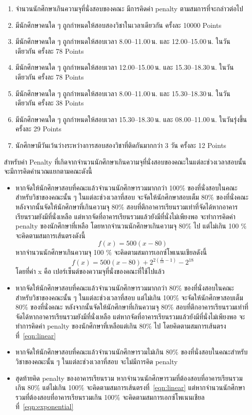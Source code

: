 \begin{enumerate}
    \item จํานวนนักศึกษาเกินความจุที่นั่งสอบของคณะ มีการคิดค่า penalty ตามสมการที่จะกล่าวต่อไป
    \item มีนักศึกษาคนใด ๆ ถูกกำหนดให้สอบสองวิชาในเวลาเดียวกัน ครั้งละ 10000 Points
    \item มีนักศึกษาคนใด ๆ ถูกกำหนดให้สอบเวลา 8.00--11.00\,น. และ 12.00--15.00\,น. ในวันเดียวกัน ครั้งละ 78 Points
    \item มีนักศึกษาคนใด ๆ ถูกกำหนดให้สอบเวลา 12.00--15.00\,น. และ 15.30--18.30\,น. ในวันเดียวกัน ครั้งละ 78 Points
    \item มีนักศึกษาคนใด ๆ ถูกกำหนดให้สอบเวลา 8.00--11.00\,น. และ 15.30--18.30\,น. ในวันเดียวกัน ครั้งละ 38 Points
    \item มีนักศึกษาคนใด ๆ ถูกกำหนดให้สอบเวลา 15.30--18.30\,น. และ 08.00--11.00\,น. ในวันรุ่งขึ้น ครั้งละ 29 Points
    \item นักศึกษามีวันเว้นว่างระหว่างการสอบสองวิชาที่ติดกันมากกว่า 3 วัน ครั้งละ 12 Points
\end{enumerate}
สำหรับค่า Penalty ที่เกิดจากจำนวนนักศึกษาเกินความจุที่นั่งสอบของคณะในแต่ละช่วงเวลาสอบนั้นจะมีการคิดคำนวณแยกตามคณะดังนี้
\begin{itemize}
    \item หากจัดให้นักศึกษาสอบที่คณะแล้วจำนวนนักศึกษารวมมากกว่า 100\% ของที่นั่งสอบในคณะสำหรับวิชาของคณะนั้น ๆ ในแต่ละช่วงเวลาที่สอบ จะจัดให้นักศึกษาสอบเต็ม 80\% ของที่นั่งคณะ
    หลังจากนั้นจัดให้นักศึกษาที่เกินความจุ 80\% สอบที่ตึกอาคารเรียนรวมเท่าที่จัดได้หากอาคารเรียนรวมยังมีที่นั่งเหลือ แต่หากจัดที่อาคารเรียนรวมแล้วยังมีที่นั่งไม่เพียงพอ จะทำการคิดค่า penalty ของนักศึกษาที่เหลือ
    โดยหากจำนวนนักศึกษาเกินความจุ 80\% ไป แต่ไม่เกิน 100 \% จะคิดตามสมการเส้นตรงดังนี้ 
    \begin{equation}
    \label{eqn:linear}
        f(x)=500(x-80)
    \end{equation}
    หากจำนวนนักศึกษาเกินความจุ 100 \% จะคิดตามสมการเอกซ์โพเนนเชียลดังนี้ 
    \begin{equation}
    \label{eqn:exponential}
        f(x)=500(x-80)+2^{2(\frac{x}{10}-1)}-2^{18}
    \end{equation}
    โดยที่ค่า x คือ เปอร์เซ็นต์ของความจุที่นั่งของคณะที่ใช้ไปแล้ว
    \item หากจัดให้นักศึกษาสอบที่คณะแล้วจำนวนนักศึกษารวมมากกว่า 80\% ของที่นั่งสอบในคณะสำหรับวิชาของคณะนั้น ๆ ในแต่ละช่วงเวลาที่สอบ แต่ไม่เกิน 100\% จะจัดให้นักศึกษาสอบเต็ม 80\% ของที่นั่งคณะ
    หลังจากนั้นจัดให้นักศึกษาที่เกินความจุ 80\% สอบที่ตึกอาคารเรียนรวมเท่าที่จัดได้หากอาคารเรียนรวมยังมีที่นั่งเหลือ แต่หากจัดที่อาคารเรียนรวมแล้วยังมีที่นั่งไม่เพียงพอ จะทำการคิดค่า penalty ของนักศึกษาที่เหลือแต่เกิน 80\% ไป
    โดยคิดตามสมการเส้นตรงที่~\ref{eqn:linear}
    \item หากจัดให้นักศึกษาสอบที่คณะแล้วจำนวนนักศึกษารวมไม่เกิน 80\% ของที่นั่งสอบในคณะสำหรับวิชาของคณะนั้น ๆ ในแต่ละช่วงเวลาที่สอบ จะไม่มีการคิด penalty
    \item สุดท้ายคิด penalty ของอาคารเรียนรวม หากจำนวนนักศึกษารวมที่ต้องสอบที่อาคารเรียนรวมเกิน 80\% แต่ไม่เกิน 100\% จะคิดตามสมการเส้นตรงที่~\ref{eqn:linear} แต่หากจำนวนนักศึกษารวมที่ต้องสอบที่อาคารเรียนรวมเกิน 100\% จะคิดตามสมการเอกซ์โพเนนเชียลที่~\ref{eqn:exponential}
\end{itemize}
